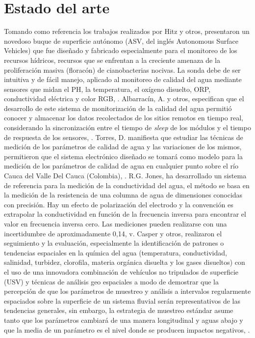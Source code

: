 \section{Estado del arte}
Tomando como referencia los trabajos realizados por Hitz y otros, presentaron un novedoso buque de superficie autónomo (ASV, del ingl\'es Autonomous Surface Vehicles) que fue dise\~nado y fabricado especialmente para el monitoreo de los recursos h\'idricos, recursos que se enfrentan a la creciente amenaza de la proliferaci\'on masiva (florac\'on) de cianobacterias nocivas. La sonda debe de ser intuitiva y de f\'acil manejo, aplicado al monitoreo de calidad del agua mediante sensores que midan el PH, la temperatura, el ox\'igeno disuelto,  ORP, conductividad el\'ectrica y color RGB, \cite{hitz2012design}. 
Albarrac\'in, A. y otros, especifican que el desarrollo de este sistema de monitorizaci\'on de la calidad del agua permiti\'o conocer y almacenar los datos recolectados de los sitios remotos en tiempo real, considerando la sincronizaci\'on entre el tiempo de \textit{sleep} de los m\'odulos y el tiempo de respuesta de los sensores, \cite{samaniegodevelopment}. 
Torres, D. manifiesta que estudiar las t\'ecnicas de medici\'on de los par\'ametros de calidad de agua y las variaciones de los mismos, permitieron que el sistema electr\'onico dise\~nado se tomar\'a como modelo para la medici\'on de los par\'ametros de calidad de agua en cualquier punto sobre el río Cauca del Valle Del Cauca (Colombia), \cite{torres2009diseno}.
R.G. Jones, ha desarrollado un sistema de referencia para la medici\'on de la conductividad del agua, el m\'etodo se basa en la medici\'on de la resistencia de una columna de agua de dimensiones conocidas con precisión. Hay un efecto de polarización del electrodo y la convención es extrapolar la conductividad en funci\'on de la frecuencia inversa para encontrar el valor en frecuencia inversa cero. Las mediciones pueden realizarse con una incertidumbre de aproximadamente 0,14, \cite{jones2002measurements}v.
Casper y otros, realizaron el seguimiento y la evaluaci\'on, especialmente la identificaci\'on de patrones o tendencias espaciales en la qu\'imica del agua (temperatura, conductividad, salinidad, turbidez, clorofila, materia org\'anica disuelta y los gases disueltos) con el uso de una innovadora combinaci\'on de veh\'iculos no tripulados de superficie (USV) y t\'ecnicas de an\'alisis geo espaciales a modo de demostrar que la percepci\'on de que los par\'ametros de muestreo y an\'alisis a intervalos regularmente espaciados sobre la superficie de un sistema fluvial ser\'an representativos de las tendencias generales, sin embargo, la estrategia de muestreo est\'andar asume tanto que los par\'ametros cambiar\'a de una manera longitudinal y aguas abajo y que la media de un par\'ametro es el nivel donde se producen impactos negativos, \cite{casper2007combining}. 
